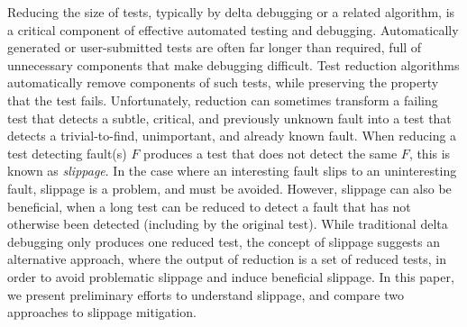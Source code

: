 Reducing the size of tests, typically by delta debugging or a related algorithm, is a critical component of effective automated testing and debugging.  Automatically generated or user-submitted tests are often far longer than required, full of unnecessary components that make debugging difficult.  Test reduction algorithms automatically remove components of such tests, while preserving the property that the test fails.  Unfortunately, reduction can sometimes transform a failing test that detects a subtle, critical, and previously unknown fault into a test that detects a trivial-to-find, unimportant, and already known fault.  When reducing a test detecting fault(s) $F$ produces a test that does not detect the same $F$, this is known as \emph{slippage}.  In the case where an interesting fault slips to an uninteresting fault, slippage is a problem, and must be avoided.  However, slippage can also be beneficial, when a long test can be reduced to detect a fault that has not otherwise been detected (including by the original test).  While traditional delta debugging only produces one reduced test, the concept of slippage suggests an alternative approach, where the output of reduction is a set of reduced tests, in order to avoid problematic slippage and induce beneficial slippage.  In this paper, we present preliminary efforts to understand slippage, and compare two approaches to slippage mitigation.